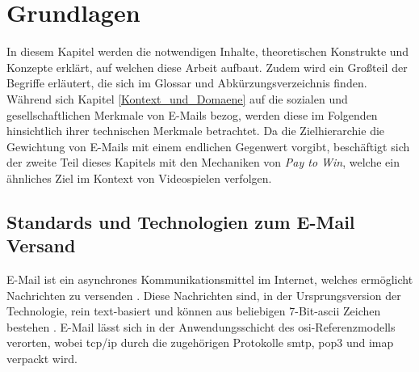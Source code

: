 
\chapter{Grundlagen}
\label{Grundlagen}

In diesem Kapitel werden die notwendigen Inhalte, theoretischen Konstrukte und Konzepte erklärt, auf welchen diese Arbeit aufbaut. Zudem wird ein Großteil der Begriffe erläutert, die sich im Glossar und Abkürzungsverzeichnis finden. Während sich Kapitel \ref{Kontext_und_Domaene} auf die sozialen und gesellschaftlichen Merkmale von E-Mails bezog, werden diese im Folgenden hinsichtlich ihrer technischen Merkmale betrachtet. Da die Zielhierarchie die Gewichtung von E-Mails mit einem endlichen Gegenwert vorgibt, beschäftigt sich der zweite Teil dieses Kapitels mit den Mechaniken von \textit{Pay to Win}, welche ein ähnliches Ziel im Kontext von Videospielen verfolgen.


\section{Standards und Technologien zum E-Mail Versand}

E-Mail ist ein asynchrones Kommunikationsmittel im Internet, welches ermöglicht Nachrichten zu versenden \citep[S. 142]{Kurose2014}. Diese Nachrichten sind, in der Ursprungsversion der Technologie, rein text-basiert und können aus beliebigen 7-Bit-\acrshort{ascii} Zeichen bestehen \citep[S. 9]{RFC5322}. E-Mail lässt sich in der Anwendungsschicht des \acrshort{osi}-Referenzmodells verorten, wobei \acrshort{tcp}/\acrshort{ip} durch die zugehörigen Protokolle \acrshort{smtp}, \acrshort{pop3} und \acrshort{imap} verpackt wird.

